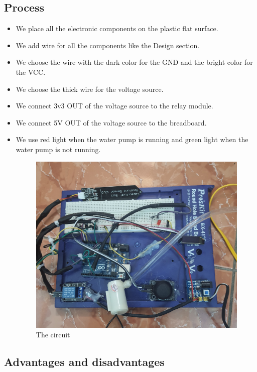 \documentclass[12pt]{article}
\begin{document}
        \subsection{Process}
        \begin{itemize}
            \item We place all the electronic components on the plastic flat surface. 
            \item We add wire for all the components like the Design section. 
            \item We choose the wire with the dark color for the GND and the bright color for the VCC.
            \item We choose the thick wire for the voltage source.
            \item We connect 3v3 OUT of the voltage source to the relay module.
            \item We connect 5V OUT of the voltage source to the breadboard.
            \item We use red light when the water pump is running and green light when the water pump is not running.
            \begin{figure}[!h]
                           \centering
                            \includegraphics[width=14cm]{images/full_mach_dien.jpg}
                            \caption{The circuit}
                            \label{fig:schematic}
                    \end{figure}
        \end{itemize}
        \subsection{Advantages and disadvantages}
\end{document}

